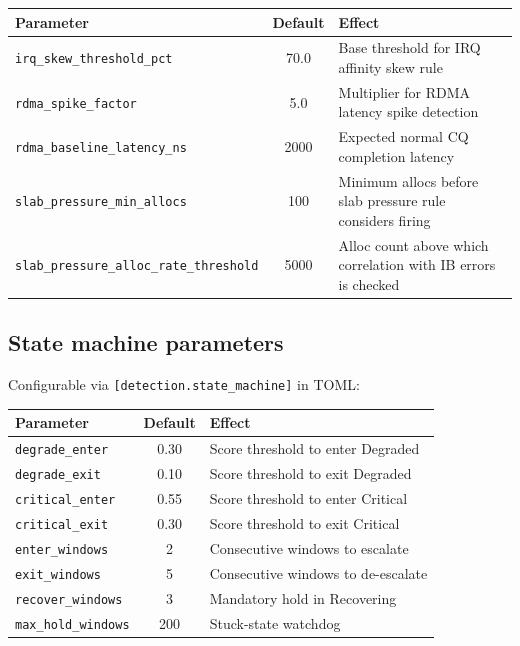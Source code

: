 \documentclass[11pt]{article}
\begin{document}
\begin{center}
\small
\begin{tabular}{lcp{6cm}}
\toprule
Parameter & Default & Effect \\
\midrule
\texttt{irq\_skew\_threshold\_pct} & 70.0 & Base threshold for IRQ affinity skew rule \\
\texttt{rdma\_spike\_factor}       & 5.0  & Multiplier for RDMA latency spike detection \\
\texttt{rdma\_baseline\_latency\_ns} & 2000 & Expected normal CQ completion latency \\
\texttt{slab\_pressure\_min\_allocs} & 100 & Minimum allocs before slab pressure rule considers firing \\
\texttt{slab\_pressure\_alloc\_rate\_threshold} & 5000 & Alloc count above which correlation with IB errors is checked \\
\bottomrule
\end{tabular}
\end{center}

\subsection{State machine parameters}

Configurable via \texttt{[detection.state\_machine]} in TOML:

\begin{center}
\small
\begin{tabular}{lcp{6cm}}
\toprule
Parameter & Default & Effect \\
\midrule
\texttt{degrade\_enter}     & 0.30 & Score threshold to enter Degraded \\
\texttt{degrade\_exit}      & 0.10 & Score threshold to exit Degraded \\
\texttt{critical\_enter}    & 0.55 & Score threshold to enter Critical \\
\texttt{critical\_exit}     & 0.30 & Score threshold to exit Critical \\
\texttt{enter\_windows}     & 2    & Consecutive windows to escalate \\
\texttt{exit\_windows}      & 5    & Consecutive windows to de-escalate \\
\texttt{recover\_windows}   & 3    & Mandatory hold in Recovering \\
\texttt{max\_hold\_windows} & 200  & Stuck-state watchdog \\
\bottomrule
\end{tabular}
\end{center}
\end{document}
